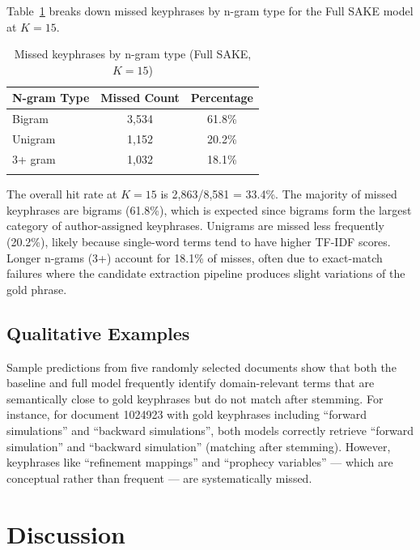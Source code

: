 \documentclass[pdflatex,sn-mathphys-num]{sn-jnl}
\begin{document}
Table~\ref{tab:errors} breaks down missed keyphrases by n-gram type for the Full SAKE model at
$K{=}15$.

\begin{table}[h]
\caption{Missed keyphrases by n-gram type (Full SAKE, $K{=}15$)}\label{tab:errors}
\begin{tabular*}{\textwidth}{@{\extracolsep\fill}lcc@{}}
\toprule
N-gram Type & Missed Count & Percentage \\
\midrule
Bigram  & 3{,}534 & 61.8\% \\
Unigram & 1{,}152 & 20.2\% \\
3+ gram & 1{,}032 & 18.1\% \\
\botrule
\end{tabular*}
\end{table}

The overall hit rate at $K{=}15$ is 2{,}863/8{,}581 = 33.4\%. The majority of missed keyphrases are
bigrams (61.8\%), which is expected since bigrams form the largest category of author-assigned
keyphrases. Unigrams are missed less frequently (20.2\%), likely because single-word terms tend to
have higher TF-IDF scores. Longer n-grams (3+) account for 18.1\% of misses, often due to
exact-match failures where the candidate extraction pipeline produces slight variations of the gold
phrase.

\subsection{Qualitative Examples}\label{sec:qualitative}

Sample predictions from five randomly selected documents show that both the baseline and full model
frequently identify domain-relevant terms that are semantically close to gold keyphrases but do not
match after stemming. For instance, for document 1024923 with gold keyphrases including ``forward
simulations'' and ``backward simulations'', both models correctly retrieve ``forward simulation''
and ``backward simulation'' (matching after stemming). However, keyphrases like ``refinement
mappings'' and ``prophecy variables'' --- which are conceptual rather than frequent --- are
systematically missed.

\section{Discussion}\label{sec:discussion}
\end{document}
